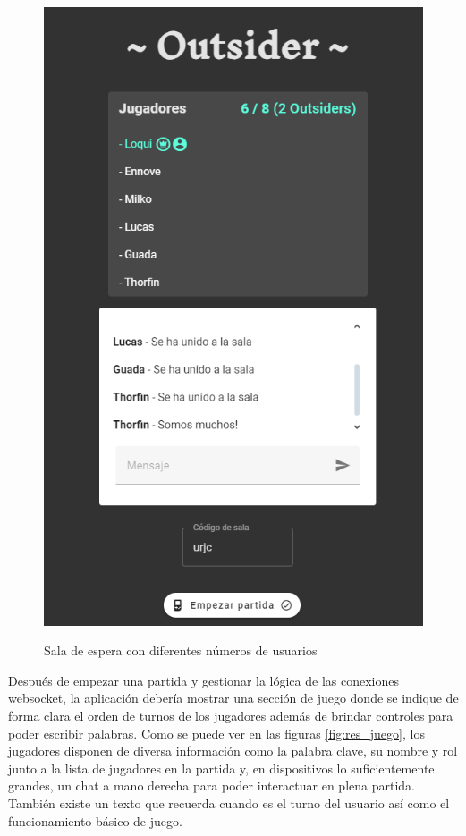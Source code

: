 \begin{figure}[h]
\begin{minipage}{0.45\textwidth}
	  \includegraphics[clip=true,width=\textwidth]{res_lobby1.png}\\
   \end{minipage}
   \caption{Sala de espera con diferentes números de usuarios}
   \label{fig:res_lobby}
 \end{figure}

Después de empezar una partida y gestionar la lógica de las conexiones websocket, la aplicación debería mostrar
una sección de juego donde se indique de forma clara el orden de turnos de los jugadores además de brindar
controles para poder escribir palabras. Como se puede ver en las figuras \ref{fig:res_juego}, los jugadores disponen
de diversa información como la palabra clave, su nombre y rol junto a la lista de jugadores en la partida y, en dispositivos
lo suficientemente grandes, un chat a mano derecha para poder interactuar en plena partida. También existe un texto que recuerda
cuando es el turno del usuario así como el funcionamiento básico de juego.

